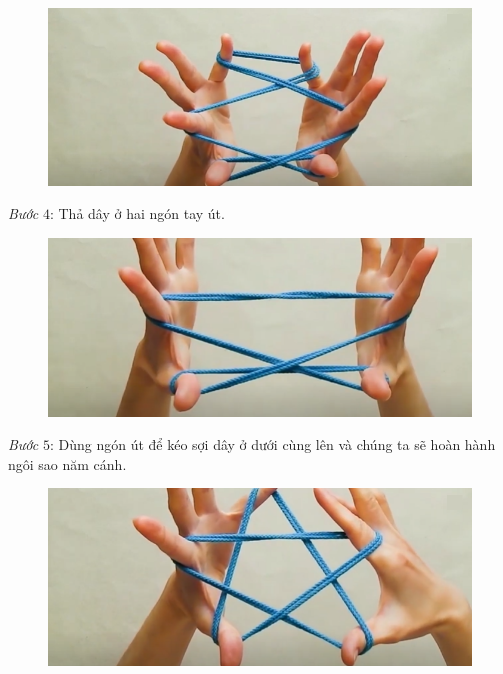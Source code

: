 \begin{multicols}{2}
\begin{figure}[H]
		\vspace*{1pt}
		\includegraphics[width=0.98\linewidth]{3d}
		\vspace*{-5pt}
	\end{figure}
	\textit{Bước} $4$: Thả dây ở hai ngón tay út.
	\begin{figure}[H]
		\vspace*{-5pt}
		\centering
		\captionsetup{labelformat= empty, justification=centering}
		\includegraphics[width= 1\linewidth]{4}
		\vspace*{-10pt}
	\end{figure}
	\textit{Bước} $5$: Dùng ngón út để kéo sợi dây ở dưới cùng lên và chúng ta sẽ hoàn hành ngôi sao năm cánh.
	\begin{figure}[H]
		\vspace*{5pt}
		\centering
		\captionsetup{labelformat= empty, justification=centering}
		\includegraphics[width= 1\linewidth]{5}

\end{figure}
\end{multicols}
